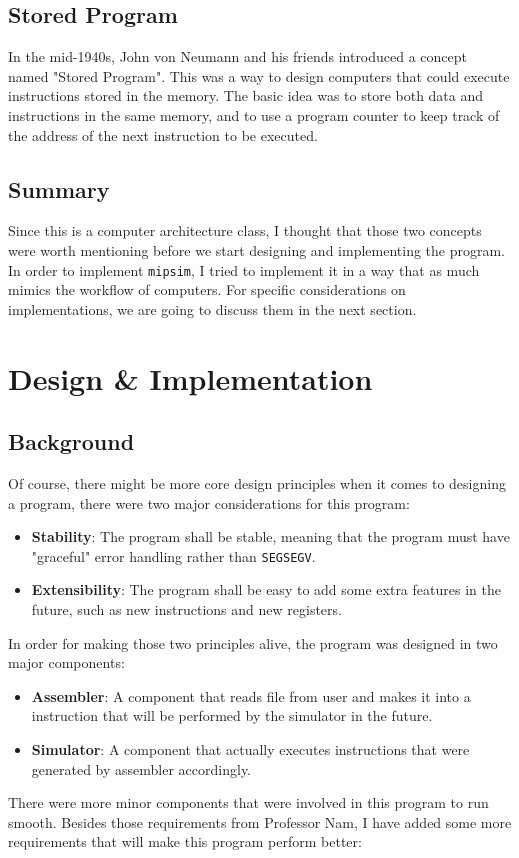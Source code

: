 \documentclass{homework}
\begin{document}
\subsection{Stored Program}
In the mid-1940s, John von Neumann and his friends introduced a concept named "Stored Program". This was a way to design computers that could execute instructions stored in the memory. The basic idea was to store both data and instructions in the same memory, and to use a program counter to keep track of the address of the next instruction to be executed. 

\subsection{Summary}
Since this is a computer architecture class, I thought that those two concepts were worth mentioning before we start designing and implementing the program. In order to implement \texttt{mipsim}, I tried to implement it in a way that as much mimics the workflow of computers. For specific considerations on implementations, we are going to discuss them in the next section.

\pagebreak
\section {Design \& Implementation}
\subsection{Background}
Of course, there might be more core design principles when it comes to designing a program, there were two major considerations for this program:
\begin{itemize}
    \item \textbf{Stability}: The program shall be stable, meaning that the program must have "graceful" error handling rather than \texttt{SEGSEGV}.
    \item \textbf{Extensibility}: The program shall be easy to add some extra features in the future, such as new instructions and new registers.
\end{itemize}

In order for making those two principles alive, the program was designed in two major components:
\begin{itemize}
    \item \textbf{Assembler}: A component that reads file from user and makes it into a instruction that will be performed by the simulator in the future.
    \item \textbf{Simulator}: A component that actually executes instructions that were generated by assembler accordingly.
\end{itemize}
There were more minor components that were involved in this program to run smooth. Besides those requirements from Professor Nam, I have added some more requirements that will make this program perform better:
\end{document}
